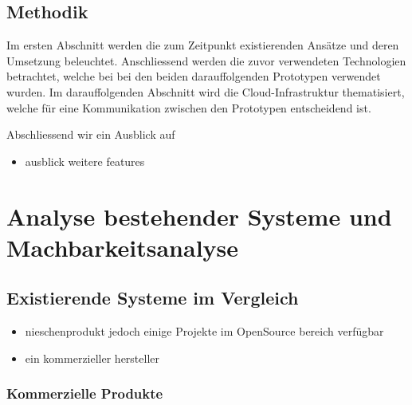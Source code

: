 \hypertarget{methodik}{%
\subsection{Methodik}\label{methodik}}

Im ersten Abschnitt werden die zum Zeitpunkt existierenden Ansätze und
deren Umsetzung beleuchtet. Anschliessend werden die zuvor verwendeten
Technologien betrachtet, welche bei bei den beiden darauffolgenden
Prototypen verwendet wurden. Im darauffolgenden Abschnitt wird die
Cloud-Infrastruktur thematisiert, welche für eine Kommunikation zwischen
den Prototypen entscheidend ist.

Abschliessend wir ein Ausblick auf

\begin{itemize}
\tightlist
\item
  ausblick weitere features
\end{itemize}

\hypertarget{analyse-bestehender-systeme-und-machbarkeitsanalyse}{%
\section{Analyse bestehender Systeme und
Machbarkeitsanalyse}\label{analyse-bestehender-systeme-und-machbarkeitsanalyse}}

\hypertarget{existierende-systeme-im-vergleich}{%
\subsection{Existierende Systeme im
Vergleich}\label{existierende-systeme-im-vergleich}}

\begin{itemize}
\tightlist
\item
  nieschenprodukt jedoch einige Projekte im OpenSource bereich verfügbar
\item
  ein kommerzieller hersteller
\end{itemize}

\hypertarget{kommerzielle-produkte}{%
\subsubsection{Kommerzielle Produkte}\label{kommerzielle-produkte}}

